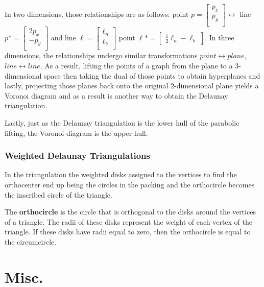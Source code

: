\documentclass[11pt]{article}
\begin{document}
In two dimensions, those relationships are as follows: point $p = 
	\begin{bmatrix}
		p_x \\
		p_y \\
	\end{bmatrix} \leftrightarrow $ line $p* = 
	\begin{bmatrix}
		2p_x \\
		-p_y \\
	\end{bmatrix}$ and line $\ell = 
	\begin{bmatrix}
		\ell_n \\
		\ell_b \\
	\end{bmatrix}$ point $\ell* = 
	\begin{bmatrix}
		\frac{1}{2}\ell_n
		-\ell_b
	\end{bmatrix}$. In three dimensions, the relationships undergo similar transformations $point \leftrightarrow plane$, $line \leftrightarrow line$. As a result, lifting the points of a graph from the plane to a 3-dimensional space then taking the dual of those points to obtain hyperplanes and lastly, projecting those planes back onto the original 2-dimensional plane yields a Voronoi diagram and as a result is another way to obtain the Delaunay triangulation.
	
Lastly, just as the Delaunay triangulation is the lower hull of the parabolic lifting, the Voronoi diagram is the upper hull.

\subsubsection{Weighted Delaunay Triangulations}

In the triangulation the weighted disks assigned to the vertices to find the orthocenter end up being the circles in the packing and the orthocircle becomes the inscribed circle of the triangle. 

The \textbf{orthocircle} is the circle that is orthogonal to the disks around the vertices of a triangle. The radii of these disks represent the weight of each vertex of the triangle. If these disks have radii equal to zero, then the orthocircle is equal to the circumcircle.

\section{Misc.}




\end{document}
